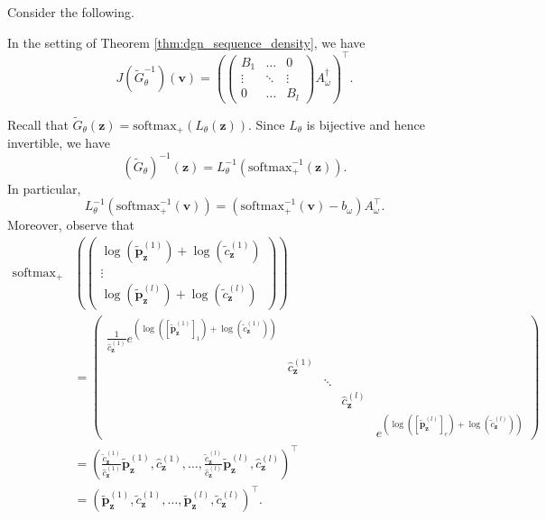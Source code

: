 \begin{tproof}

    Consider the following.

    \begin{plemma}\label{lem:jac_inverse_dgn}
        In the setting of Theorem \ref{thm:dgn_sequence_density}, we have $$J\left(\tilde{G}_{\theta}^{-1}\right)(\mathbf{v})=\left(\begin{pmatrix}B_1&\dots&0\\\vdots&\ddots&\vdots\\0&\dots&B_l\end{pmatrix}A_{\omega}^{\dagger}\right)^\top.$$
    \end{plemma}

    \begin{pproof}
        Recall that $\tilde{G}_{\theta}(\mathbf{z})=\mathrm{softmax}_+\left(L_{\theta}(\mathbf{z})\right)$. Since $L_{\theta}$ is bijective and hence invertible, we have $$\left(\tilde{G}_{\theta}\right)^{-1}(\mathbf{z})=L_{\theta}^{-1}\left(\mathrm{softmax}^{-1}_+(\mathbf{z})\right).$$ In particular, $$L_{\theta}^{-1}\left(\mathrm{softmax}_+^{-1}(\mathbf{v})\right)=\left(\mathrm{softmax}^{-1}_+(\mathbf{v})-b_{\omega}\right)A_{\omega}^\top.$$Moreover, observe that 
        \begin{align*}
            \mathrm{softmax}_+&\left(\begin{pmatrix}\log\left(\tilde{\mathbf{p}}_{\mathbf{z}}^{(1)}\right)+\log\left(\tilde{c}_{\mathbf{z}}^{(1)}\right)\\\vdots\\\log\left(\tilde{\mathbf{p}}_{\mathbf{z}}^{(l)}\right)+\log\left(\tilde{c}_{\mathbf{z}}^{(l)}\right)\end{pmatrix}\right)\\&=\begin{pmatrix}\frac{1}{\hat{c}_{\mathbf{z}}^{(1)}}e^{\left(\log\left(\left[\tilde{\mathbf{p}}_{\mathbf{z}}^{(1)}\right]_1\right)+\log\left(\tilde{c}_{\mathbf{z}}^{(1)}\right)\right)}&&&&\\&\hat{c}_{\mathbf{z}}^{(1)}&&&\\&&\ddots&&\\&&&\hat{c}_{\mathbf{z}}^{(l)}&\\&&&&e^{\left(\log\left(\left[\tilde{\mathbf{p}}_{\mathbf{z}}^{(l)}\right]_c\right)+\log\left(\tilde{c}_{\mathbf{z}}^{(l)}\right)\right)}\end{pmatrix}\\&=\left(\frac{\tilde{c}_{\mathbf{z}}^{(1)}}{\hat{c}_{\mathbf{z}}^{(1)}}\mathbf{\tilde{p}}_{\mathbf{z}}^{(1)},\hat{c}_{\mathbf{z}}^{(1)},\dots,\frac{\tilde{c}_{\mathbf{z}}^{(l)}}{\hat{c}_{\mathbf{z}}^{(l)}}\mathbf{\tilde{p}}_{\mathbf{z}}^{(l)},\hat{c}_{\mathbf{z}}^{(l)}\right)^\top\\&=\left(\tilde{\mathbf{p}}_{\mathbf{z}}^{(1)},\tilde{c}_{\mathbf{z}}^{(1)},\dots,\tilde{\mathbf{p}}_{\mathbf{z}}^{(l)},\tilde{c}_{\mathbf{z}}^{(l)}\right)^\top.

\end{align*}
\end{pproof}
\end{tproof}
